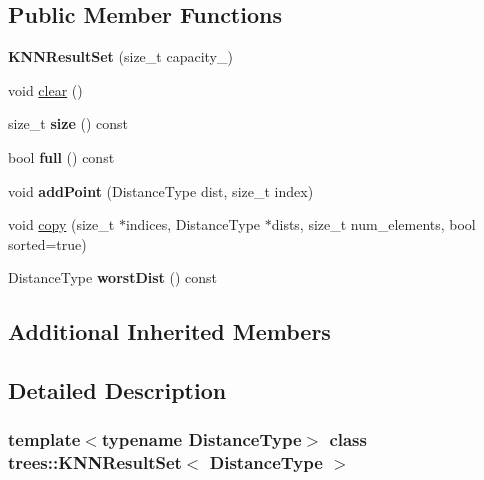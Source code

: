 \subsection*{Public Member Functions}
\begin{DoxyCompactItemize}
\item 
\mbox{\label{classtrees_1_1_k_n_n_result_set_af84c8771413e6594b2d63b54797f1ce6}} 
{\bfseries K\+N\+N\+Result\+Set} (size\+\_\+t capacity\+\_\+)
\item 
void \hyperlink{classtrees_1_1_k_n_n_result_set_a6faafd1ae6f7dbe5a9fdcf03c244141c}{clear} ()
\item 
\mbox{\label{classtrees_1_1_k_n_n_result_set_a3fdf3248d81cfdb9e68b5fc94a46ca38}} 
size\+\_\+t {\bfseries size} () const
\item 
\mbox{\label{classtrees_1_1_k_n_n_result_set_a88d22190d5d32bea60224b55959e336b}} 
bool {\bfseries full} () const
\item 
\mbox{\label{classtrees_1_1_k_n_n_result_set_a41aa290d7219ec1e8eca98c04364ba09}} 
void {\bfseries add\+Point} (Distance\+Type dist, size\+\_\+t index)
\item 
void \hyperlink{classtrees_1_1_k_n_n_result_set_a3e1b80d0f5c564f74d840c9838653a39}{copy} (size\+\_\+t $\ast$indices, Distance\+Type $\ast$dists, size\+\_\+t num\+\_\+elements, bool sorted=true)
\item 
\mbox{\label{classtrees_1_1_k_n_n_result_set_a684b5be0f09a8ede3cc18e028d4f0e48}} 
Distance\+Type {\bfseries worst\+Dist} () const
\end{DoxyCompactItemize}
\subsection*{Additional Inherited Members}


\subsection{Detailed Description}
\subsubsection*{template$<$typename Distance\+Type$>$\newline
class trees\+::\+K\+N\+N\+Result\+Set$<$ Distance\+Type $>$}

